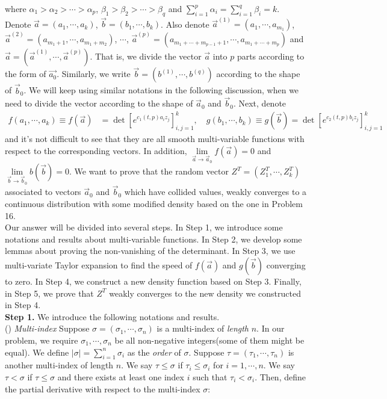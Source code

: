 \documentclass[12pt]{article}
\begin{document}
where $\alpha_{1}>\alpha_{2}>\cdots>\alpha_{p}$, $\beta_{1}>\beta_{2}>\cdots>\beta_{q}$ and $\sum_{i=1}^{p}\alpha_{i}=\sum_{i=1}^{q}\beta_{i}=k$. Denote $\vec{a}=(a_{1},\cdots,a_{k})$, $\vec{b}=(b_{1},\cdots,b_{k})$. Also denote $\vec{a}^{(1)}=(a_{1},\cdots,a_{m_1})$, $\vec{a}^{(2)}=(a_{m_{1}+1},\cdots,a_{m_1+m_2})$, $\cdots$, $\vec{a}^{(p)}=(a_{m_1+\cdots+m_{p-1}+1},\cdots, a_{m_1+\cdots+m_{p}})$ and $\vec{a}=(\vec{a}^{(1)},\cdots,\vec{a}^{(p)})$. That is, we divide the vector $\vec{a}$ into $p$ parts according to the form of $\vec{a_{0}}$. Similarly, we write $\vec{b}=(b^{(1)},\cdots,b^{(q)})$ according to the shape of $\vec{b}_{0}$. We will keep using similar notations in the following discussion, when we need to divide the vector according to the shape of $\vec{a}_{0}$ and $\vec{b}_{0}$. Next, denote
\begin{align*}
	f(a_{1},\cdots,a_{k})\equiv f(\vec{a})&=\det[e^{c_1(t,p)a_{i}z_{j}}]_{i,j=1}^{k},\quad g(b_{1},\cdots,b_{k})\equiv g(\vec{b})=\det[e^{c_2(t,p)b_{i}z_{j}}]_{i,j=1}^{k}
\end{align*} 
and it's not difficult to see that they are all smooth multi-variable functions with respect to the corresponding vectors. In addition, $\lim\limits_{\vec{a}\rightarrow\vec{a}_{0}}f(\vec{a})=0$ and $\lim\limits_{\vec{b}\rightarrow\vec{b}_{0}}b(\vec{b})=0$. We want to prove that the random vector $Z^{T}=(Z_{1}^{T},\cdots,Z_{k}^{T})$ associated to vectors $\vec{a}_{0}$ and $\vec{b}_{0}$ which have collided values, weakly converges to a continuous distribution with some modified density based on the one in Problem 16.\\
Our answer will be divided into several steps. In Step 1, we introduce some notations and results about multi-variable functions. In Step 2, we develop some lemmas about proving the non-vanishing of the determinant. In Step 3, we use multi-variate Taylor expansion to find the speed of $f(\vec{a})$ and $g(\vec{b})$ converging to zero. In Step 4, we construct a new density function based on Step 3. Finally, in Step 5, we prove that $Z^{T}$ weakly converges to the new density we constructed in Step 4.\\
\textbf{Step 1. } We introduce the following notations and results.\\
() \emph{Multi-index} Suppose $\sigma = (\sigma_{1},\cdots,\sigma_{n})$ is a multi-index of \emph{length} $n$. In our problem, we require $\sigma_{1},\cdots,\sigma_{n}$ be all non-negative integers(some of them might be equal). We define $|\sigma|=\sum_{i=1}^{n}\sigma_{i}$ as the \emph{order} of $\sigma$. Suppose $\tau=(\tau_{1},\cdots,\tau_{n})$ is another multi-index of length $n$. We say $\tau\leqslant \sigma$ if $\tau_{i}\leqslant \sigma_{i}$ for $i=1,\cdots,n$. We say $\tau<\sigma$ if $\tau\leqslant \sigma$ and there exists at least one index $i$ such that $\tau_{i}<\sigma_{i}$. Then, define the partial derivative with respect to the multi-index $\sigma$:
\end{document}
